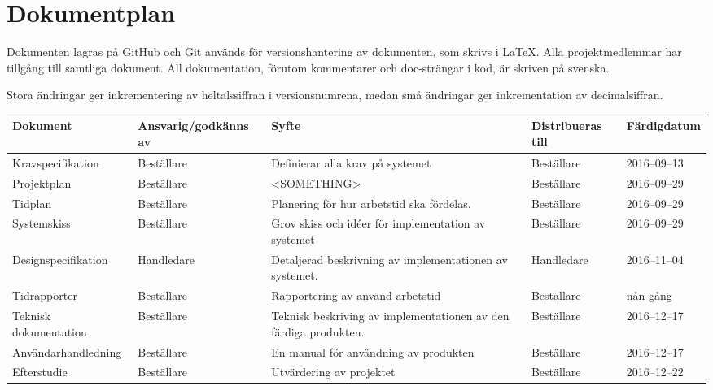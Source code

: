 \documentclass[a4paper,titlepage,12pt]{article}
\begin{document}
	
	\section{Dokumentplan}
    Dokumenten lagras på GitHub och Git används för versionshantering av
    dokumenten, som skrivs i LaTeX. Alla projektmedlemmar har tillgång till
    samtliga dokument. All dokumentation, förutom kommentarer och doc-strängar
    i kod, är skriven på svenska.

    Stora ändringar ger inkrementering av heltalssiffran i versionsnumrena,
    medan små ändringar ger inkrementation av decimalsiffran.
	
    \begin{longtable}[c]{ l l l>{\raggedright}p{} l }
        \textbf{Dokument} & \textbf{Ansvarig/godkänns av} & \textbf{Syfte} & \textbf{Distribueras till} & \textbf{Färdigdatum} \\ \midrule
        
        Kravspecifikation & Beställare & Definierar alla krav på
        systemet & Beställare & 2016--09--13 \\ \midrule

        Projektplan & Beställare & <SOMETHING> & Beställare &
        2016--09--29 \\ \midrule

        Tidplan & Beställare & Planering för hur arbetstid ska
        fördelas. & Beställare & 2016--09--29  \\ \midrule
        
        Systemskiss & Beställare & Grov skiss och idéer för 
        implementation av systemet & Beställare & 2016--09--29 \\ \midrule

        Designspecifikation & Handledare & Detaljerad beskrivning av
        implementationen av systemet. & Handledare & 2016--11--04 \\ \midrule

        Tidrapporter & Beställare & Rapportering av använd arbetstid &
        Beställare & nån gång %
        \\ \midrule

        Teknisk dokumentation & Beställare & Teknisk beskriving av
        implementationen av den färdiga produkten. & Beställare &
        2016--12--17 \\ \midrule

        Användarhandledning & Beställare & En manual för användning av
        produkten & Beställare & 2016--12--17 \\ \midrule

        Efterstudie & Beställare & Utvärdering av projektet &
        Beställare & 2016--12--22  \\ \midrule
    \end{longtable}
	
\end{document}
